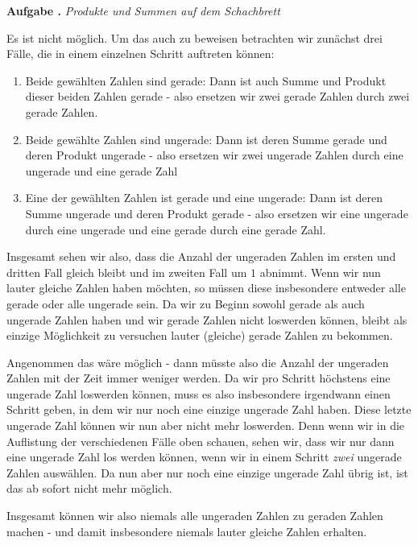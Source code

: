\documentclass[a4paper,ngerman,12pt]{scrartcl}
\theoremstyle{definition}
\theoremstyle{plain}
\theoremstyle{remark}
\newlength{\aufgabenskip}
\newcounter{aufgabennummer}
\newenvironment{aufgabe}[1]{
	\addtocounter{aufgabennummer}{1}
	\textbf{Aufgabe \theaufgabennummer.} \emph{#1} \par
}{\vspace{\aufgabenskip}}
\begin{document}
\begin{aufgabe}{Produkte und Summen auf dem Schachbrett}
	Es ist nicht möglich. Um das auch zu beweisen betrachten wir zunächst drei Fälle, die in einem einzelnen Schritt auftreten können:
	\begin{enumerate}
		\item Beide gewählten Zahlen sind gerade: Dann ist auch Summe und Produkt dieser beiden Zahlen gerade - also ersetzen wir zwei gerade Zahlen durch zwei gerade Zahlen.
		\item Beide gewählte Zahlen sind ungerade: Dann ist deren Summe gerade und deren Produkt ungerade - also ersetzen wir zwei ungerade Zahlen durch eine ungerade und eine gerade Zahl
		\item Eine der gewählten Zahlen ist gerade und eine ungerade: Dann ist deren Summe ungerade und deren Produkt gerade - also ersetzen wir eine ungerade durch eine ungerade und eine gerade durch eine gerade Zahl.
	\end{enumerate}
	Insgesamt sehen wir also, dass die Anzahl der ungeraden Zahlen im ersten und dritten Fall gleich bleibt und im zweiten Fall um $1$ abnimmt. Wenn wir nun lauter gleiche Zahlen haben möchten, so müssen diese insbesondere entweder alle gerade oder alle ungerade sein. Da wir zu Beginn sowohl gerade als auch ungerade Zahlen haben und wir gerade Zahlen nicht loswerden können, bleibt als einzige Möglichkeit zu versuchen lauter (gleiche) gerade Zahlen zu bekommen.
	
	Angenommen das wäre möglich - dann müsste also die Anzahl der ungeraden Zahlen mit der Zeit immer weniger werden. Da wir pro Schritt höchstens eine ungerade Zahl loswerden können, muss es also insbesondere irgendwann einen Schritt geben, in dem wir nur noch eine einzige ungerade Zahl haben. Diese letzte ungerade Zahl können wir nun aber nicht mehr loswerden. Denn wenn wir in die Auflistung der verschiedenen Fälle oben schauen, sehen wir, dass wir nur dann eine ungerade Zahl los werden können, wenn wir in einem Schritt \emph{zwei} ungerade Zahlen auswählen. Da nun aber nur noch eine einzige ungerade Zahl übrig ist, ist das ab sofort nicht mehr möglich.
	
	Insgesamt können wir also niemals alle ungeraden Zahlen zu geraden Zahlen machen - und damit insbesondere niemals lauter gleiche Zahlen erhalten.
\end{aufgabe}
\end{document}
